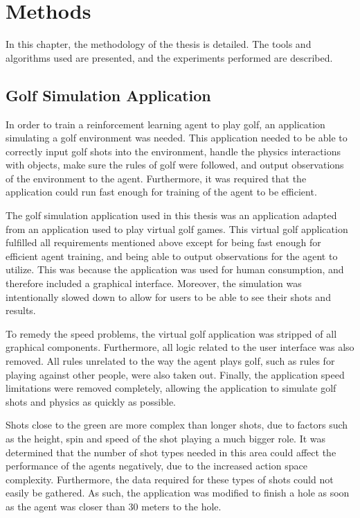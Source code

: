 \documentclass{kththesis}
\begin{document}
\chapter{Methods}
\label{chapter:methods}
In this chapter, the methodology of the thesis is detailed. The tools and algorithms used are presented, and the experiments performed are described. 

\section{Golf Simulation Application}
In order to train a reinforcement learning agent to play golf, an application simulating a golf environment was needed. This application needed to be able to correctly input golf shots into the environment, handle the physics interactions with objects, make sure the rules of golf were followed, and output observations of the environment to the agent. Furthermore, it was required that the application could run fast enough for training of the agent to be efficient.

The golf simulation application used in this thesis was an application adapted from an application used to play virtual golf games. This virtual golf application fulfilled all requirements mentioned above except for being fast enough for efficient agent training, and being able to output observations for the agent to utilize. This was because the application was used for human consumption, and therefore included a graphical interface. Moreover, the simulation was intentionally slowed down to allow for users to be able to see their shots and results. 

To remedy the speed problems, the virtual golf application was stripped of all graphical components. Furthermore, all logic related to the user interface was also removed. All rules unrelated to the way the agent plays golf, such as rules for playing against other people, were also taken out. Finally, the application speed limitations were removed completely, allowing the application to simulate golf shots and physics as quickly as possible.

Shots close to the green are more complex than longer shots, due to factors such as the height, spin and speed of the shot playing a much bigger role. It was determined that the number of shot types needed in this area could affect the performance of the agents negatively, due to the increased action space complexity. Furthermore, the data required for these types of shots could not easily be gathered. As such, the application was modified to finish a hole as soon as the agent was closer than 30 meters to the hole.
\end{document}
